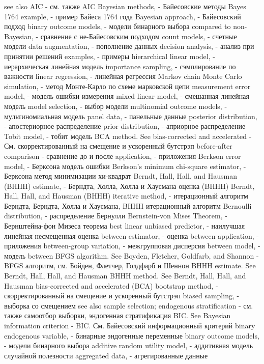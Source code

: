 see also AIC - см. также AIC
Bayesian methods, - Байесовские методы
Bayes 1764 example, - пример Байеса 1764 года
Bayesian approach, - Байесовский подход
binary outcome models, - модели бинарного выбора
compared to non-Bayesian, - сравнение с не-Байесовским подходом
count models, - счетные модели
data augmentation, - пополнение данных
decision analysis, - анализ при принятии решений
examples, - примеры
hierarchical linear model, - иерархическая линейная модель
importance sampling, - сэмплирование по важности
linear regression, - линейная регрессия
Markov chain Monte Carlo simulation, - метод Монте-Карло по схеме марковской цепи
measurement error model, - модель ошибки измерения
mixed linear model, - смешанная линейная модель
model selection, - выбор модели
multinomial outcome models, - мультиномиальная модель
panel data, - панельные данные
posterior distribution, - апостериорное распределение
prior distribution, - априорное распределение
Tobit model, - тобит модель
BCA method. See bias-corrected and accelerated - См. скорректированный на смещение и ускоренный бутстрэп
before-after comparison - сравнение до и после
application, - приложения
Berkson error model, - Берксона модель ошибки
Berkson’s minimum chi-square estimator, - Берксона метод минимизации хи-квадрат
Berndt, Hall, Hall, and Hausman (BHHH) estimate, - Берндта, Холла, Холла и Хаусмана оценка (BHHH)
Berndt, Hall, Hall, and Hausman (BHHH) iterative method, - итерационный алгоритм Берндта, Берндта, Холла и Хаусмана, BHHH итерационный алгоритм
Bernoulli distribution, - распределение Бернулли
Bernstein-von Mises Theorem, - Бернштейна-фон Мизеса теорема
best linear unbiased predictor, - наилучшая линейная несмещенная оценка
between estimator, - оценка between
application, - приложения
between-group variation, - межгрупповая дисперсия
between model, - модель between
BFGS algorithm. See Boyden, Fletcher, Goldfarb, and Shannon - BFGS алгоритм, см. Бойден, Флетчер, Голдфарб и Шеннон
BHHH estimate. See Berndt, Hall, Hall, and Hausman BHHH method. See Berndt, Hall, Hall, and Hausman
bias-corrected and accelerated (BCA) bootstrap method, - скорректированный на смещение и ускоренный бутстрэп
biased sampling, - выборка со смещением
see also sample selection; endogenous stratification - см. также самоотбор выборки, эндогенная стратификация
BIC. See Bayesian information criterion - BIC. См. Байесовский информационный критерий
binary endogenous variable, - бинарные эндогенные переменные
binary outcome models, - модели бинарного выбора
additive random utility model, - аддитивная модель случайной полезности
aggregated data, - агрегированные данные

